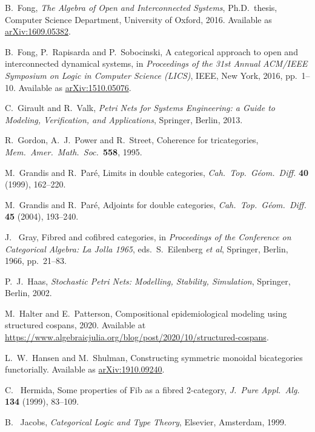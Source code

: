 \documentclass[reqno]{amsart}
\theoremstyle{definition}
\theoremstyle{remark}
\begin{document}
\begin{thebibliography}{100}
 B.\ Fong, \textsl{The Algebra of Open and Interconnected Systems},
Ph.D.\ thesis, Computer Science Department, University of Oxford, 2016.
Available as \href{https://arxiv.org/abs/1609.05382}{arXiv:1609.05382}.

 B.\ Fong, P.\ Rapisarda and P.\ Sobocinski, A categorical approach to open and interconnected dynamical systems, in \textsl{Proceedings of the 31st Annual ACM/IEEE Symposium on Logic in Computer Science (LICS)}, IEEE, New York, 2016, pp.\ 1--10.  Available as \href{http://arxiv.org/abs/510.05076}{arXiv:1510.05076}.

 C.\ Girault and R.\ Valk, \textsl{Petri Nets for Systems Engineering: a Guide to Modeling, Verification, and Applications}, Springer, Berlin, 2013.

 R.\ Gordon, A.\ J.\ Power and R.\ Street, Coherence for tricategories, \textsl{Mem.\ Amer.\ Math.\ Soc.\ }\textbf{558}, 1995.

 M.\ Grandis and R.\ Par\'e, Limits in double categories, \textsl{Cah.\ Top.\ G\'eom.\ Diff.} \textbf{40} (1999), 162--220.

 M.\ Grandis and R.\ Par\'e, Adjoints for double categories, 
 \textsl{Cah.\ Top.\ G\'eom.\ Diff.} \textbf{45} (2004), 193--240.

 J. \ Gray, Fibred and cofibred categories, in \textsl{Proceedings of the Conference on Categorical Algebra: La Jolla 1965}, eds.\ S.\ Eilenberg \textit{et al}, Springer, Berlin, 1966, pp.\ 21--83.

 P.\ J.\ Haas, \textsl{Stochastic Petri Nets: Modelling, Stability, Simulation},
Springer, Berlin, 2002.

 M.\ Halter and E.\ Patterson, Compositional epidemiological modeling using structured cospans, 2020.  Available at \href{https://www.algebraicjulia.org/blog/post/2020/10/structured-cospans}{https://www.algebraicjulia.org/blog/post/2020/10/structured-cospans}.

  L.\ W.\ Hansen and M.\ Shulman, Constructing symmetric monoidal bicategories functorially.  Available as \href{https://arxiv.org/abs/1910.09240}{arXiv:1910.09240}.

 C. \ Hermida, Some properties of Fib as a fibred 2-category, \textsl{J.\ Pure Appl.\ Alg.\ } \textbf{134} (1999), 83--109.

 B. \ Jacobs, \textsl{Categorical Logic and Type Theory}, Elsevier, Amsterdam, 1999.


\end{thebibliography}
\end{document}
